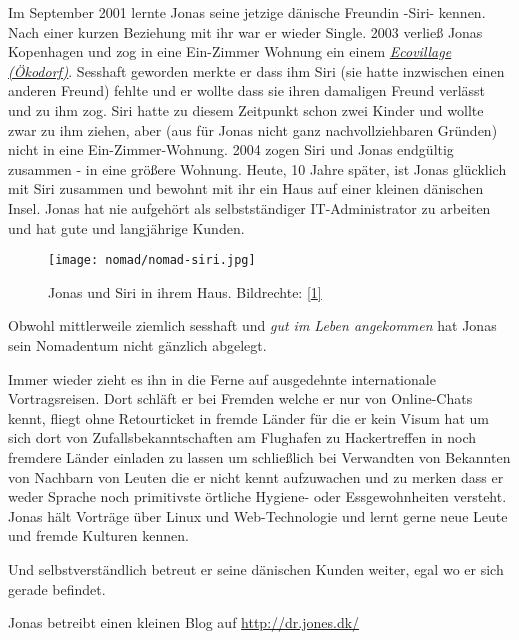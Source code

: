 Im September 2001 lernte Jonas seine jetzige dänische Freundin -Siri- kennen. Nach einer kurzen Beziehung mit ihr war er wieder Single. 2003 verließ Jonas Kopenhagen und zog in eine Ein-Zimmer Wohnung ein einem \href{https://en.wikipedia.org/wiki/Ecovillage}{\textit{Ecovillage (Ökodorf)}}. Sesshaft geworden merkte er dass ihm Siri (sie hatte inzwischen einen anderen Freund) fehlte und er wollte dass sie ihren damaligen Freund verlässt und zu ihm zog. Siri hatte zu diesem Zeitpunkt schon zwei Kinder und wollte zwar zu ihm ziehen, aber (aus für Jonas nicht ganz nachvollziehbaren Gründen) nicht in eine Ein-Zimmer-Wohnung. 2004 zogen Siri und Jonas endgültig zusammen - in eine größere Wohnung. Heute, 10 Jahre später, ist Jonas glücklich mit Siri zusammen und bewohnt mit ihr ein Haus auf einer kleinen dänischen Insel. Jonas hat nie aufgehört als selbstständiger IT-Administrator zu arbeiten und hat gute und langjährige Kunden. 


\begin{figure}
\texttt{[image: nomad/nomad-siri.jpg]}
\caption{Jonas und Siri in ihrem Haus. Bildrechte: \href{http://dr.jones.dk}{{[}1{]}}}
\end{figure}

Obwohl mittlerweile ziemlich sesshaft und \emph{gut im Leben angekommen} hat Jonas sein Nomadentum nicht gänzlich abgelegt.

Immer wieder  zieht es ihn in die Ferne auf ausgedehnte internationale Vortragsreisen. Dort schläft er bei Fremden welche er nur von Online-Chats kennt, fliegt ohne Retourticket in fremde Länder für die er kein Visum hat um sich dort von Zufallsbekanntschaften am Flughafen zu Hackertreffen in noch fremdere Länder einladen zu lassen um schließlich bei Verwandten von Bekannten von Nachbarn von Leuten die er nicht kennt aufzuwachen und zu merken dass er weder Sprache noch primitivste örtliche Hygiene- oder Essgewohnheiten versteht. Jonas hält  Vorträge über Linux und Web-Technologie und lernt gerne neue Leute und fremde Kulturen kennen.

Und selbstverständlich betreut er seine dänischen Kunden weiter, egal wo er sich gerade befindet.

Jonas betreibt einen kleinen Blog auf \url{http://dr.jones.dk/} 



